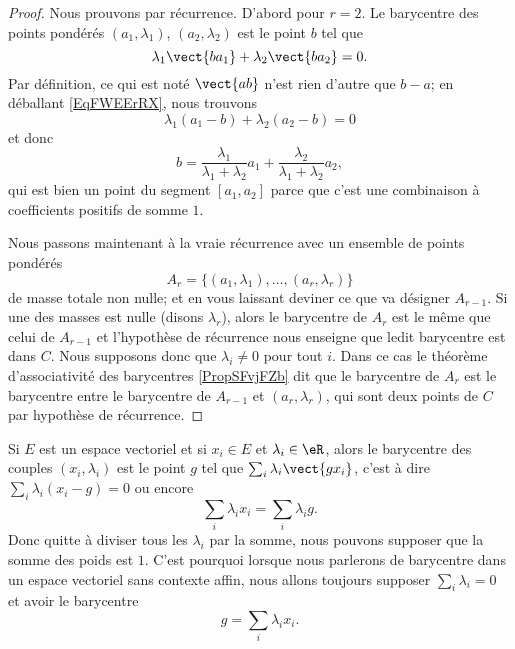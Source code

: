 \begin{proof}
    Nous prouvons par récurrence. D'abord pour \( r=2\). Le barycentre des points pondérés \( (a_1,\lambda_1)\), \( (a_2,\lambda_2)\) est le point \( b\) tel que
    \begin{equation}        \label{EqFWEErRX}
        \lambda_1\vect{ ba_1 }+\lambda_2\vect{ ba_2 }=0.
    \end{equation}
    Par définition, ce qui est noté \( \vect{ ab }\) n'est rien d'autre que \( b-a\); en déballant \eqref{EqFWEErRX}, nous trouvons
    \begin{equation}
        \lambda_1(a_1-b)+\lambda_2(a_2-b)=0
    \end{equation}
    et donc
    \begin{equation}
        b=\frac{ \lambda_1 }{ \lambda_1+\lambda_2 }a_1+\frac{ \lambda_2 }{ \lambda_1+\lambda_2 }a_2,
    \end{equation}
    qui est bien un point du segment \( [a_1,a_2]\) parce que c'est une combinaison à coefficients positifs de somme \( 1\).

    Nous passons maintenant à la vraie récurrence avec un ensemble de points pondérés
    \begin{equation}
        A_r=\{ (a_1,\lambda_1),\ldots, (a_r,\lambda_r) \}
    \end{equation}
    de masse totale non nulle; et en vous laissant deviner ce que va désigner \( A_{r-1}\). Si une des masses est nulle (disons \( \lambda_r\)), alors le barycentre de \( A_r\) est le même que celui de \( A_{r-1}\) et l'hypothèse de récurrence nous enseigne que ledit barycentre est dans \( C\). Nous supposons donc que \( \lambda_i\neq 0\) pour tout \( i\). Dans ce cas le théorème d'associativité des barycentres \ref{PropSFvjFZb} dit que le barycentre de \( A_r\) est le barycentre entre le barycentre de \( A_{r-1}\) et \( (a_r,\lambda_r)\), qui sont deux points de \( C\) par hypothèse de récurrence. 
\end{proof}

Si \( E\) est un espace vectoriel et si \( x_i\in E\) et \( \lambda_i\in \eR\), alors le barycentre des couples \( (x_i,\lambda_i)\) est le point \( g\) tel que \( \sum_i\lambda_i\vect{ gx_i }\), c'est à dire \( \sum_i\lambda_i(x_i-g)=0\) ou encore
\begin{equation}
    \sum_i\lambda_ix_i=\sum_i\lambda_ig.
\end{equation}
Donc quitte à diviser tous les \( \lambda_i\) par la somme, nous pouvons supposer que la somme des poids est \( 1\). C'est pourquoi lorsque nous parlerons de barycentre dans un espace vectoriel sans contexte affin, nous allons toujours supposer \( \sum_i\lambda_i=0\) et avoir le barycentre
\begin{equation}
    g=\sum_i\lambda_ix_i.
\end{equation}

